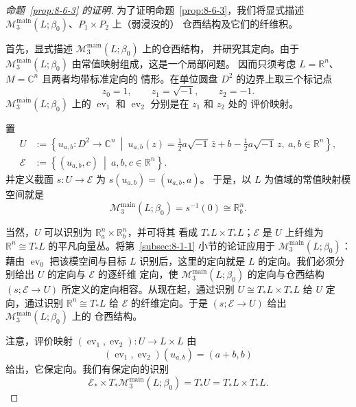 \begin{proof}[命题~\ref{prop:8-6-3} 的证明]
为了证明命题~\ref{prop:8-6-3}，我们将显式描述
$\mathcal M_3^{\mathrm{main}}(L;\beta_0)$、$P_1\times P_2$ 上（弱浸没的）
仓西结构及它们的纤维积。

首先，显式描述 $\mathcal M_3^{\mathrm{main}}(L;\beta_0)$ 上的仓西结构，
并研究其定向。由于
$\mathcal M_3^{\mathrm{main}}(L;\beta_0)$ 由常值映射组成，这是一个局部问题。
因而只须考虑 $L=\mathbb R^n$、$M=\mathbb C^n$ 且两者均带标准定向的
情形。在单位圆盘 $D^2$ 的边界上取三个标记点
\[
 z_0=1,\qquad z_1=\sqrt{-1},\qquad z_2=-1.
\]
$\mathcal M_3^{\mathrm{main}}(L;\beta_0)$ 上的
$\operatorname{ev}_1$ 和 $\operatorname{ev}_2$ 分别是在 $z_1$ 和 $z_2$ 处的
评价映射。

置
\[
\begin{aligned}
 U&:=\left\{u_{a,b}\colon D^2\to\mathbb C^n\ \middle|\
 u_{a,b}(z)=\frac12a\sqrt{-1}\,\bar z+b
 -\frac12a\sqrt{-1}\,z,
 \ a,b\in\mathbb R^n\right\},\\
 \mathcal E&:=\left\{(u_{a,b},c)\ \middle|\
 a,b,c\in\mathbb R^n\right\}.
\end{aligned}
\]
并定义截面 $s\colon U\to\mathcal E$ 为
$s(u_{a,b})=(u_{a,b},a)$。%
于是，以 $L$ 为值域的常值映射模空间就是
\[
 \mathcal M_3^{\mathrm{main}}(L;\beta_0)=s^{-1}(0)
 \cong\mathbb R_b^n.
\]

当然，$U$ 可以识别为 $\mathbb R_a^n\times\mathbb R_b^n$，并可将其
看成 $T_*L\times T_*L$；$\mathcal E$ 是 $U$ 上纤维为
$\mathbb R^n\cong T_*L$ 的平凡向量丛。将第~\ref{subsec:8-1-1}
小节的论证应用于 $\mathcal M_3^{\mathrm{main}}(L;\beta_0)$：藉由
$\operatorname{ev}_0$ 把该模空间与目标 $L$ 识别后，这里的定向就是
$L$ 的定向。我们必须分别给出 $U$ 的定向与 $\mathcal E$ 的逐纤维
定向，使 $\mathcal M_3^{\mathrm{main}}(L;\beta_0)$ 的定向与仓西结构
$(s;\mathcal E\to U)$ 所定义的定向相容。从现在起，通过识别
$U\cong T_*L\times T_*L$ 给 $U$ 定向，通过识别
$\mathbb R^n\cong T_*L$ 给 $\mathcal E$ 的纤维定向。于是
$(s;\mathcal E\to U)$ 给出 $\mathcal M_3^{\mathrm{main}}(L;\beta_0)$ 上的
仓西结构。

注意，评价映射
$(\operatorname{ev}_1,\operatorname{ev}_2)\colon U\to L\times L$ 由
\[
 (\operatorname{ev}_1,\operatorname{ev}_2)(u_{a,b})=(a+b,b)
\]
给出，它保定向。我们有保定向的识别
\[
 \mathcal E_*\times T_*\mathcal M_3^{\mathrm{main}}(L;\beta_0)
 =T_*U=T_*L\times T_*L.
\]


\end{proof}
